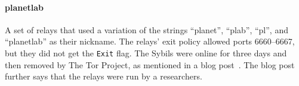 \paragraph{planetlab}
A set of relays that used a variation of the strings ``planet'', ``plab'',
``pl'', and ``planetlab'' as their nickname.  The relays' exit policy allowed
ports 6660--6667, but they did not get the \texttt{Exit} flag.  The Sybils were
online for three days and then removed by The Tor Project, as mentioned in a
blog post~\cite{planetlab}.  The blog post further says that the relays were run
by a researchers.
